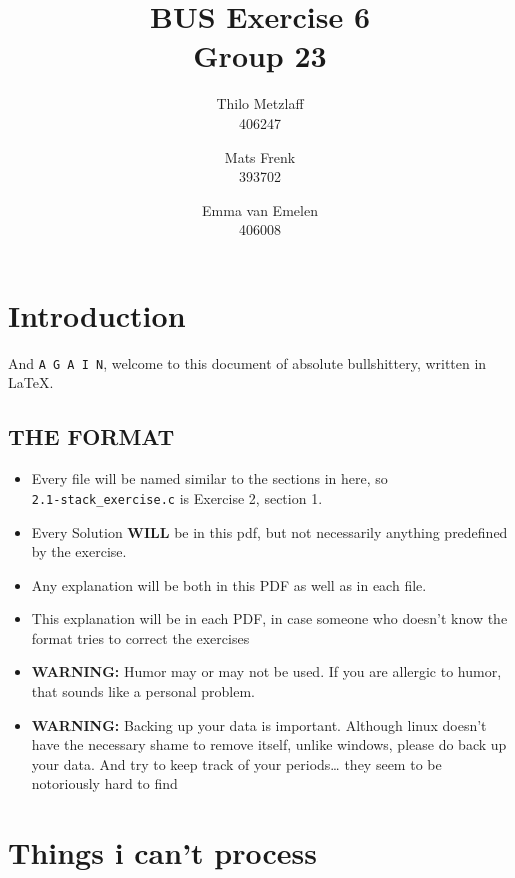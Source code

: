 \documentclass[a4paper, 11pt]{article}
\author{Thilo Metzlaff\\406247 \and Mats Frenk\\393702\and Emma van Emelen\\406008}
\title{BUS Exercise 6 \\ Group 23}
\begin{document}
      \maketitle
      \newpage

      \tableofcontents
      \newpage

      \section*{Introduction}
      And \texttt{A G A I N}, welcome to this document of absolute bullshittery, written in \LaTeX.   



      \subsection*{THE FORMAT}
      \begin{itemize}
            \item Every file will be named similar to the sections in here, so\\
            \texttt{2.1-stack\_exercise.c} is Exercise 2, section 1.
            \item Every Solution \textbf{WILL} be in this pdf, but not necessarily 
                  anything predefined by the exercise.
            \item Any explanation will be both in this PDF as well as in each file.
            \item This explanation will be in each PDF, in case someone who doesn't
                  know the format tries to correct the exercises
            \item \textbf{WARNING:} Humor may or may not be used. If you are allergic
                  to humor, that sounds like a personal problem.
            \item \textbf{WARNING:} Backing up your data is important. Although linux 
                  doesn't have the necessary shame to remove itself, unlike windows,
                  please do back up your data. And try to keep track of your periods\dots
                  they seem to be notoriously hard to find
      \end{itemize}
      \newpage

      \section{Things i can't process}
\end{document}
